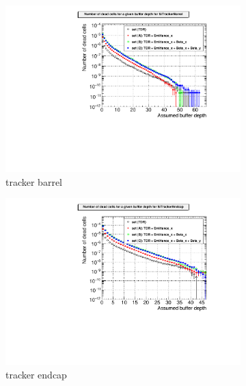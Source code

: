 \begin{figure}
 \centering
   \begin{subfigure}[b]{0.49\textwidth}
   \centering
    \includegraphics[width=\textwidth]{Figures/Pairs/Appendix/Occupancy_Comparison_All_layers_deadcells_ILC250_ALL_SETS_SiTrackerBarrel.pdf}
   \caption{\sid tracker barrel}
   \end{subfigure}
   \hfill
    \begin{subfigure}[b]{0.49\textwidth}
   \centering
    \includegraphics[width=\textwidth]{Figures/Pairs/Appendix/Occupancy_Comparison_All_layers_deadcells_ILC250_ALL_SETS_SiTrackerEndcap.pdf}
   \caption{\sid tracker endcap}
   \end{subfigure}\\
    \begin{subfigure}[b]{0.49\textwidth}

\end{subfigure}
\end{figure}
